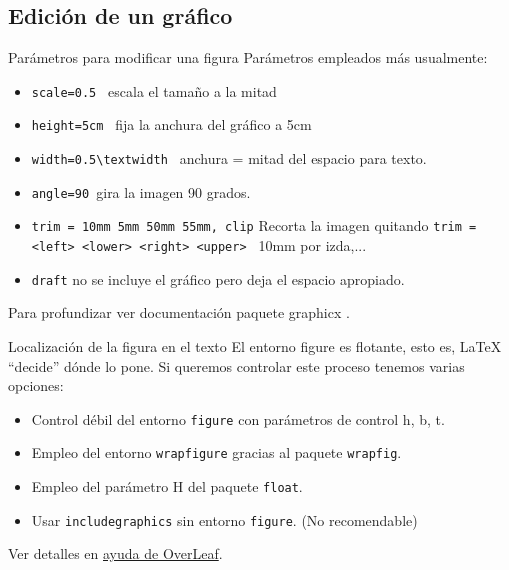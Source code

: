 \documentclass[10pt]{beamer}
\begin{document}
\subsection{Edici\'on de un gr\'afico}
\begin{frame}[fragile]{Parámetros para modificar una figura}
Parámetros empleados más usualmente:
\begin{itemize}
    \item \verb|scale=0.5 | \hfill escala el tamaño a la mitad
    \item \verb|height=5cm | \hfill fija la anchura del gráfico a 5cm
    \item \verb|width=0.5\textwidth | \hfill anchura = mitad del espacio para texto.
    \item \verb|angle=90 |\hfill  gira la imagen 90 grados.
    \item \verb|trim = 10mm 5mm 50mm 55mm, clip| \hfill Recorta la imagen quitando
\verb|trim = <left> <lower> <right> <upper> | \hfill 10mm por izda,...
    \item \verb|draft| \hfill no se incluye el gráfico pero deja el espacio apropiado.
\end{itemize}
\vspace{1cm}
Para profundizar ver documentaci\'on paquete graphicx \cite{DocGraphicx} .
\end{frame}
\begin{frame}[fragile]{Localización de la figura en el texto}
El entorno figure es flotante, esto es, \LaTeX{} ``decide''
dónde lo pone. Si queremos controlar este proceso tenemos varias 
opciones:
\begin{itemize}
    \item Control débil del entorno \verb|figure| con parámetros 
    de control h, b, t. 
    \item Empleo del entorno \verb|wrapfigure| \cite{wrapfigure} gracias al paquete \verb|wrapfig|.
    \item Empleo del parámetro H del paquete \verb|float|.
    \item Usar \verb|includegraphics| sin entorno \verb|figure|. \hfill (No recomendable)
\end{itemize}
\vspace{1cm}
Ver detalles en \href{https://www.overleaf.com/learn/latex/Positioning_images_and_tables}{\color{blue}ayuda de OverLeaf}.
\end{frame}
\end{document}
